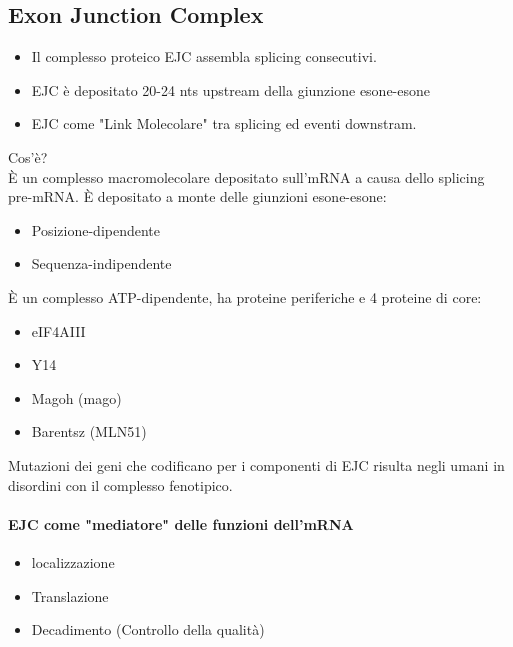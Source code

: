 \documentclass{article}
\begin{document}
\subsection{Exon Junction Complex}
\begin{itemize}
    \item Il complesso proteico EJC assembla splicing consecutivi.
    \item EJC è depositato 20-24 nts upstream della giunzione esone-esone
    \item EJC come "Link Molecolare" tra splicing ed eventi downstram.
\end{itemize}
Cos'è?\\
È un complesso macromolecolare depositato sull'mRNA a causa dello splicing pre-mRNA. È depositato a monte delle giunzioni esone-esone:
\begin{itemize}
    \item Posizione-dipendente
    \item Sequenza-indipendente
\end{itemize}
È un complesso ATP-dipendente, ha proteine periferiche e 4 proteine di core:
\begin{itemize}
    \item eIF4AIII
    \item Y14
    \item Magoh (mago)
    \item Barentsz (MLN51)
\end{itemize}
Mutazioni dei geni che codificano per i componenti di EJC risulta negli umani in disordini con il complesso fenotipico.
\paragraph{EJC come "mediatore" delle funzioni dell'mRNA}
\begin{itemize}
    \item localizzazione
    \item Translazione
    \item Decadimento (Controllo della qualità)
\end{itemize}
\end{document}

